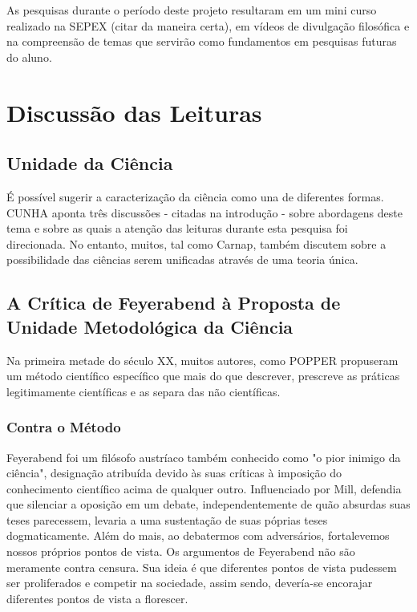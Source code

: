 \documentclass[12pt]{report}
\begin{document}
	As pesquisas durante o período deste projeto resultaram em um mini curso realizado na SEPEX (citar da maneira certa), em vídeos de divulgação filosófica e na compreensão de temas que servirão como fundamentos em pesquisas futuras do aluno.
	
	\section{Discussão das Leituras}
	
	\subsection{Unidade da Ciência}
	
		É possível sugerir a caracterização da ciência como una de diferentes formas. CUNHA  aponta três discussões - citadas na introdução - sobre abordagens deste tema e sobre as quais a atenção das leituras durante esta pesquisa foi direcionada. No entanto, muitos, tal como Carnap, também discutem sobre a possibilidade das ciências serem unificadas através de uma teoria única.
		
	\subsection{A Crítica de Feyerabend à Proposta de Unidade Metodológica da Ciência}
		
		Na primeira metade do século XX, muitos autores, como POPPER  propuseram um método científico específico que mais do que descrever, prescreve as práticas legitimamente científicas e as separa das não científicas.
		
		\subsubsection{Contra o Método}
			
			Feyerabend foi um filósofo austríaco também conhecido como "o pior inimigo da ciência", designação atribuída devido às suas críticas à imposição do conhecimento científico acima de qualquer outro. Influenciado por Mill, defendia que silenciar a oposição em um debate, independentemente de quão absurdas suas teses parecessem, levaria a uma sustentação de suas póprias teses dogmaticamente. Além do mais, ao debatermos com adversários, fortalevemos nossos próprios pontos de vista. Os argumentos de Feyerabend não são meramente contra censura. Sua ideia é que diferentes pontos de vista pudessem ser proliferados e competir na sociedade, assim sendo, devería-se encorajar diferentes pontos de vista a florescer.
			
\end{document}
